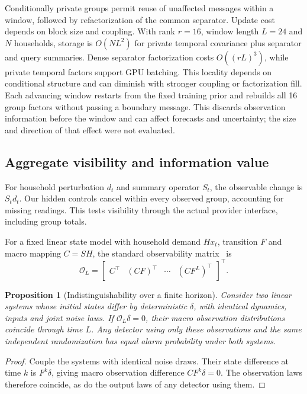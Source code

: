 \documentclass[conference]{IEEEtran}
\newtheorem{proposition}{Proposition}
\begin{document}
Conditionally private groups permit reuse of unaffected messages within a window, followed by refactorization of the common separator. Update cost depends on block size and coupling. With rank $r=16$, window length $L=24$ and $N$ households, storage is $O(NL^2)$ for private temporal covariance plus separator and query summaries. Dense separator factorization costs $O((rL)^3)$, while private temporal factors support GPU batching. This locality depends on conditional structure and can diminish with stronger coupling or factorization fill. Each advancing window restarts from the fixed training prior and rebuilds all 16 group factors without passing a boundary message. This discards observation information before the window and can affect forecasts and uncertainty; the size and direction of that effect were not evaluated.







\subsection{Aggregate visibility and information value}
For household perturbation $d_t$ and summary operator $S_t$, the observable change is $S_t d_t$. Our hidden controls cancel within every observed group, accounting for missing readings. This tests visibility through the actual provider interface, including group totals.

For a fixed linear state model with household demand $Hx_t$, transition $F$ and macro mapping $C=SH$, the standard observability matrix~\cite{hespanha} is
\begin{equation}
\mathcal O_L=\begin{bmatrix}C^\top&(CF)^\top&\cdots&(CF^L)^\top\end{bmatrix}^{\!\top}.
\end{equation}
\begin{proposition}[Indistinguishability over a finite horizon]
Consider two linear systems whose initial states differ by deterministic $\delta$, with identical dynamics, inputs and joint noise laws. If $\mathcal O_L\delta=0$, their macro observation distributions coincide through time $L$. Any detector using only these observations and the same independent randomization has equal alarm probability under both systems.
\end{proposition}
\begin{proof}
Couple the systems with identical noise draws. Their state difference at time $k$ is $F^k\delta$, giving macro observation difference $CF^k\delta=0$. The observation laws therefore coincide, as do the output laws of any detector using them.
\end{proof}
\end{document}
